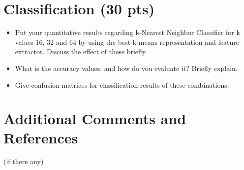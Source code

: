 \documentclass[12pt]{article}
\begin{document}
\section{Classification (30 pts)}
    \begin{itemize}
        \item Put your quantitative results regarding k-Nearest Neighbor Classifier for k values 16, 32 and 64 by using the best k-means representation and feature extractor. Discuss the effect of these briefly.
        \item What is the accuracy values, and how do you evaluate it? Briefly explain.
        \item Give confusion matrices for classification results of these combinations.
    \end{itemize}


\section{Additional Comments and References}

    (if there any)
\end{document}
